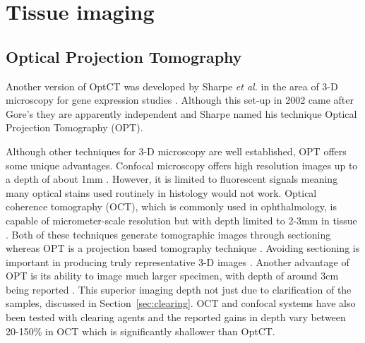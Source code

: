 \documentclass[12pt]{article}
\begin{document}

 









\section{Tissue imaging}
\label{sec:tissue}
\subsection{Optical Projection Tomography}
\label{subsec:OPT}
Another version of OptCT was  developed by Sharpe \textit{et al.} in the area of 3-D microscopy for gene expression studies \cite{Sharpe:2002jp}. Although this set-up in 2002 came after Gore's they are apparently independent and Sharpe named his technique Optical Projection Tomography (OPT).

Although other techniques for 3-D microscopy are well established, OPT offers some unique advantages. 
Confocal microscopy offers high resolution images up to a depth of about 1mm \cite{Webb:1996}. However, it is limited to fluorescent signals meaning many optical stains used routinely in histology would not work. Optical coherence tomography (OCT), which is commonly used in ophthalmology, is capable of micrometer-scale resolution but with  depth limited to 2-3mm in tissue \cite{huang1993optical}. Both of these techniques generate tomographic images through sectioning whereas OPT is a projection based tomography technique \cite{Sharpe:2003cm}. Avoiding sectioning is important in producing truly representative 3-D images \cite{Oldham:2007ku}. Another advantage of  OPT is its ability to  image much larger specimen, with depth of around 3cm being reported \cite{Oldham:2007ku}. This superior imaging depth not just due to clarification of the samples, discussed in Section~\ref{sec:clearing}. OCT and confocal systems have also been tested with clearing agents and the reported gains in depth vary between 20-150\% in OCT \cite{Tuchin:2002} which is significantly shallower than OptCT.
\end{document}
